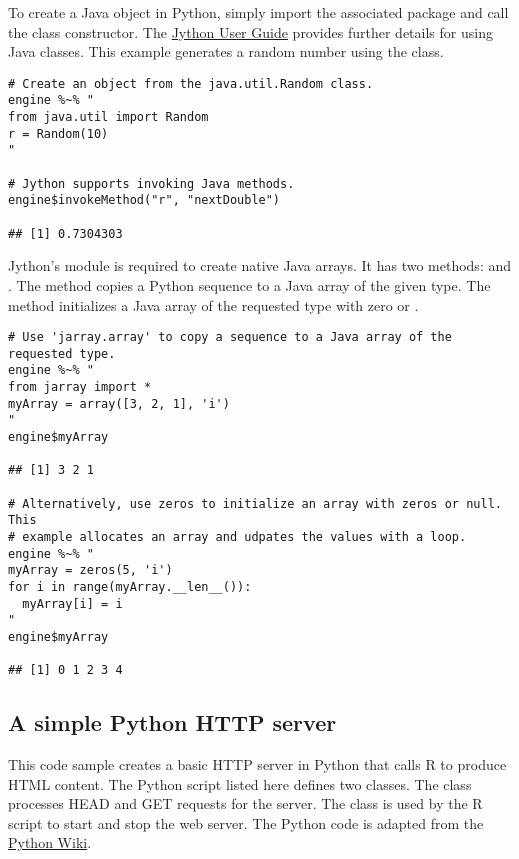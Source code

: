 To create a Java object in Python, simply import the associated package and call the class constructor. The \href{https://wiki.python.org/jython/NewUsersGuide}{Jython User Guide} provides further details for using Java classes. This example generates a random number using the  class.

\begin{verbatim}
# Create an object from the java.util.Random class.
engine %~% "
from java.util import Random
r = Random(10)
"

# Jython supports invoking Java methods.
engine$invokeMethod("r", "nextDouble")

## [1] 0.7304303
\end{verbatim}

Jython's  module is required to create native Java arrays. It has two methods:  and . The  method copies a Python sequence to a Java array of the given type. The  method initializes a Java array of the requested type with zero or .

\begin{verbatim}
# Use 'jarray.array' to copy a sequence to a Java array of the requested type.
engine %~% "
from jarray import *
myArray = array([3, 2, 1], 'i')
"
engine$myArray

## [1] 3 2 1

# Alternatively, use zeros to initialize an array with zeros or null. This
# example allocates an array and udpates the values with a loop.
engine %~% "
myArray = zeros(5, 'i')
for i in range(myArray.__len__()):
  myArray[i] = i
"
engine$myArray

## [1] 0 1 2 3 4
\end{verbatim}

\subsection{A simple Python HTTP server}

This code sample creates a basic HTTP server in Python that calls R to produce HTML content. The Python script listed here defines two classes. The  class processes HEAD and GET requests for the server. The  class is used by the R script to start and stop the web server. The Python code is adapted from the \href{https://wiki.python.org/moin/BaseHttpServer}{Python Wiki}.

